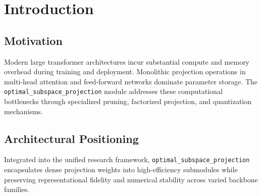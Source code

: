 \section{Introduction}

\subsection{Motivation}
Modern large transformer architectures incur substantial compute and memory overhead during training and deployment. Monolithic projection operations in multi-head attention and feed-forward networks dominate parameter storage. The \texttt{optimal_subspace_projection} module addresses these computational bottlenecks through specialized pruning, factorized projection, and quantization mechanisms.

\subsection{Architectural Positioning}
Integrated into the unified research framework, \texttt{optimal_subspace_projection} encapsulates dense projection weights into high-efficiency submodules while preserving representational fidelity and numerical stability across varied backbone families.
